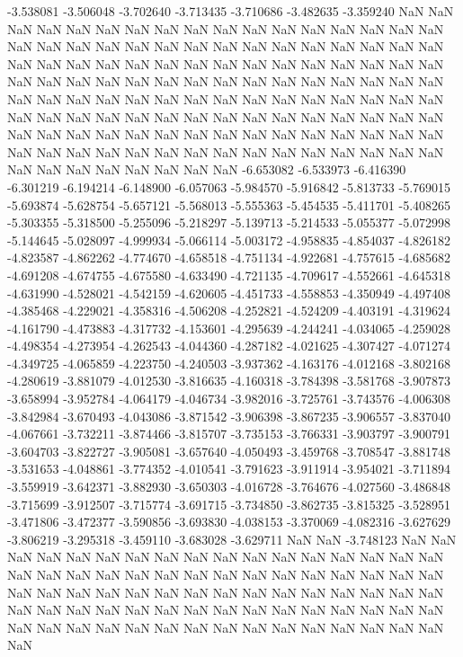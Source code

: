 -3.538081
-3.506048
-3.702640
-3.713435
-3.710686
-3.482635
-3.359240
NaN
NaN
NaN
NaN
NaN
NaN
NaN
NaN
NaN
NaN
NaN
NaN
NaN
NaN
NaN
NaN
NaN
NaN
NaN
NaN
NaN
NaN
NaN
NaN
NaN
NaN
NaN
NaN
NaN
NaN
NaN
NaN
NaN
NaN
NaN
NaN
NaN
NaN
NaN
NaN
NaN
NaN
NaN
NaN
NaN
NaN
NaN
NaN
NaN
NaN
NaN
NaN
NaN
NaN
NaN
NaN
NaN
NaN
NaN
NaN
NaN
NaN
NaN
NaN
NaN
NaN
NaN
NaN
NaN
NaN
NaN
NaN
NaN
NaN
NaN
NaN
NaN
NaN
NaN
NaN
NaN
NaN
NaN
NaN
NaN
NaN
NaN
NaN
NaN
NaN
NaN
NaN
NaN
NaN
NaN
NaN
NaN
NaN
NaN
NaN
NaN
NaN
NaN
NaN
NaN
NaN
NaN
NaN
NaN
NaN
NaN
NaN
NaN
NaN
NaN
NaN
NaN
NaN
NaN
NaN
NaN
NaN
NaN
NaN
NaN
NaN
NaN
NaN
NaN
NaN
-6.653082
-6.533973
-6.416390
-6.301219
-6.194214
-6.148900
-6.057063
-5.984570
-5.916842
-5.813733
-5.769015
-5.693874
-5.628754
-5.657121
-5.568013
-5.555363
-5.454535
-5.411701
-5.408265
-5.303355
-5.318500
-5.255096
-5.218297
-5.139713
-5.214533
-5.055377
-5.072998
-5.144645
-5.028097
-4.999934
-5.066114
-5.003172
-4.958835
-4.854037
-4.826182
-4.823587
-4.862262
-4.774670
-4.658518
-4.751134
-4.922681
-4.757615
-4.685682
-4.691208
-4.674755
-4.675580
-4.633490
-4.721135
-4.709617
-4.552661
-4.645318
-4.631990
-4.528021
-4.542159
-4.620605
-4.451733
-4.558853
-4.350949
-4.497408
-4.385468
-4.229021
-4.358316
-4.506208
-4.252821
-4.524209
-4.403191
-4.319624
-4.161790
-4.473883
-4.317732
-4.153601
-4.295639
-4.244241
-4.034065
-4.259028
-4.498354
-4.273954
-4.262543
-4.044360
-4.287182
-4.021625
-4.307427
-4.071274
-4.349725
-4.065859
-4.223750
-4.240503
-3.937362
-4.163176
-4.012168
-3.802168
-4.280619
-3.881079
-4.012530
-3.816635
-4.160318
-3.784398
-3.581768
-3.907873
-3.658994
-3.952784
-4.064179
-4.046734
-3.982016
-3.725761
-3.743576
-4.006308
-3.842984
-3.670493
-4.043086
-3.871542
-3.906398
-3.867235
-3.906557
-3.837040
-4.067661
-3.732211
-3.874466
-3.815707
-3.735153
-3.766331
-3.903797
-3.900791
-3.604703
-3.822727
-3.905081
-3.657640
-4.050493
-3.459768
-3.708547
-3.881748
-3.531653
-4.048861
-3.774352
-4.010541
-3.791623
-3.911914
-3.954021
-3.711894
-3.559919
-3.642371
-3.882930
-3.650303
-4.016728
-3.764676
-4.027560
-3.486848
-3.715699
-3.912507
-3.715774
-3.691715
-3.734850
-3.862735
-3.815325
-3.528951
-3.471806
-3.472377
-3.590856
-3.693830
-4.038153
-3.370069
-4.082316
-3.627629
-3.806219
-3.295318
-3.459110
-3.683028
-3.629711
NaN
NaN
-3.748123
NaN
NaN
NaN
NaN
NaN
NaN
NaN
NaN
NaN
NaN
NaN
NaN
NaN
NaN
NaN
NaN
NaN
NaN
NaN
NaN
NaN
NaN
NaN
NaN
NaN
NaN
NaN
NaN
NaN
NaN
NaN
NaN
NaN
NaN
NaN
NaN
NaN
NaN
NaN
NaN
NaN
NaN
NaN
NaN
NaN
NaN
NaN
NaN
NaN
NaN
NaN
NaN
NaN
NaN
NaN
NaN
NaN
NaN
NaN
NaN
NaN
NaN
NaN
NaN
NaN
NaN
NaN
NaN
NaN
NaN
NaN
NaN
NaN
NaN
NaN
NaN
NaN
NaN
